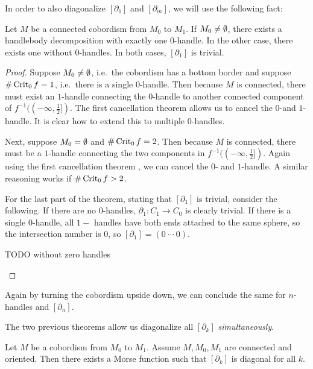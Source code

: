 In order to also diagonalize $[\partial_1]$ and  $[\partial_m]$, we will use the following fact:
\begin{theorem}
    Let $M$ be a connected cobordism from  $ M_0$ to $ M_1$.
    If $ M_0 \neq \emptyset$, there exists a handlebody decomposition with exactly one $0$-handle. In the other case, there exists one without $0$-handles.
    In both cases, $[\partial_1]$ is trivial.
    \label{thm:no-zero}
\end{theorem}
\begin{proof}
    Suppose $M_0 \neq \emptyset$, i.e.\ the cobordism has a bottom border and suppose $\# \operatorname{Crit}_0 f =1$, i.e.\ there is a single $0$-handle.
    Then because $M$ is connected, there must exist an $1$-handle connecting the $0$-handle to another connected component of $f^{-1}((-\infty, \frac{1}{2}])$.
    The first cancellation theorem allows us to cancel the $0$-and  $1$-handle.
    It is clear how to extend this to multiple $0$-handles.

    Next, suppose $M_0 = \emptyset$ and $\# \operatorname{Crit}_0 f  = 2$. Then because $M$ is  connected, there must be a $1$-handle connecting the two components in $f^{-1}((-\infty, \frac{1}{2}])$. Again using the first cancellation theorem , we can cancel the $0$- and $1$-handle. A similar reasoning works if $\# \operatorname{Crit}_0 f > 2$.

    For the last part of the theorem, stating that $[\partial_1]$ is trivial, consider the following. 
    If there are no  $0$-handles, $\partial_1: C_1 \to  C_0$ is clearly trivial.
    If there is a single $0$-handle, all $1-$ handles have both ends attached to the same sphere, so the intersection number is $0$, so $[\partial_1] = (0 \ \cdots \ 0)$.
\begin{marginfigure}
    \centering
    \caption{TODO without zero handles}
    \label{fig:without-zero-handles}
\end{marginfigure}
\end{proof}
\begin{remark}
    Again by turning the cobordism upside down, we can conclude the same for $n$-handles and $[\partial_n]$.
\end{remark}

The two previous theorems allow us diagonalize all $[\partial_k]$ \emph{simultaneously}.
\begin{theorem}
    Let $M$ be a cobordism from  $ M_0$ to $M_{1}$.
    Assume $M, M_0, M_1$ are connected and oriented.
    Then there exists a Morse function such that $[\partial_k]$ is diagonal for all $k$.
\end{theorem}


